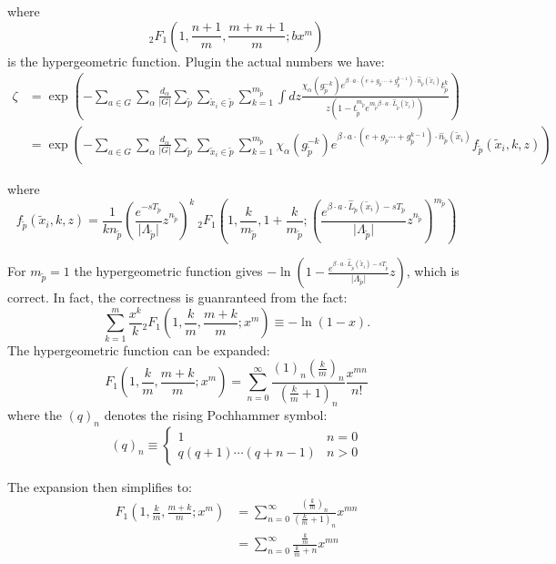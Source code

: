 \begin{description}
where 
\[
_{2}F_{1}(1,\frac{n+1}{m},\frac{m+n+1}{m};bx^{m})
\]
is the hypergeometric function. Plugin the actual numbers we have:
\begin{align*}
\zeta & =\exp\left(-\sum_{a\in G}\sum_{\alpha}\frac{d_{\alpha}}{\vert G\vert}\sum_{\tilde{p}}\sum_{\tilde{x}_{i}\in\tilde{p}}\sum_{k=1}^{m_{\tilde{p}}}\int dz\frac{\chi_{\alpha}(g_{\tilde{p}}^{-k})e^{\beta\cdot a\cdot(e+g_{\tilde{p}}\cdots+g_{\tilde{p}}^{k-1})\cdot\hat{n}_{\tilde{p}}(\tilde{x}_{i})}t_{\tilde{p}}^{k}}{z(1-t_{\tilde{p}}^{m_{\tilde{p}}}e^{m_{\tilde{p}}\beta\cdot a\cdot\hat{L}_{\tilde{p}}(\tilde{x}_{i})})}\right)\\
 & =\exp\left(-\sum_{a\in G}\sum_{\alpha}\frac{d_{\alpha}}{\vert G\vert}\sum_{\tilde{p}}\sum_{\tilde{x}_{i}\in\tilde{p}}\sum_{k=1}^{m_{\tilde{p}}}\chi_{\alpha}(g_{\tilde{p}}^{-k})e^{\beta\cdot a\cdot(e+g_{\tilde{p}}\cdots+g_{\tilde{p}}^{k-1})\cdot\hat{n}_{\tilde{p}}(\tilde{x}_{i})}f_{\tilde{p}}(\tilde{x}_{i},k,z)\right)
\end{align*}


where 
\[
f_{\tilde{p}}(\tilde{x}_{i},k,z)=\frac{1}{kn_{\tilde{p}}}\left(\frac{e^{-sT_{\tilde{p}}}}{\vert\Lambda_{\tilde{p}}\vert}z^{n_{\tilde{p}}}\right)^{k}\ _{2}F_{1}\left(1,\frac{k}{m_{\tilde{p}}},1+\frac{k}{m_{\tilde{p}}};\left(\frac{e^{\beta\cdot a\cdot\hat{L}_{\tilde{p}}(\tilde{x}_{i})-sT_{\tilde{p}}}}{\vert\Lambda_{\tilde{p}}\vert}z^{n_{\tilde{p}}}\right)^{m_{\tilde{p}}}\right)
\]


For $m_{\tilde{p}}=1$ the hypergeometric function gives $-\ln(1-\frac{e^{\beta\cdot a\cdot\hat{L}_{\tilde{p}}(\tilde{x}_{i})-sT_{\tilde{p}}}}{\vert\Lambda_{\tilde{p}}\vert}z)$,
which is correct. In fact, the correctness is guanranteed from the
fact: 
\[
\sum_{k=1}^{m}\frac{x^{k}}{k}{}_{2}F_{1}(1,\frac{k}{m},\frac{m+k}{m};x^{m})\equiv-\ln(1-x).
\]
The hypergeometric function can be expanded:
\[
F_{1}(1,\frac{k}{m},\frac{m+k}{m};x^{m})=\sum_{n=0}^{\infty}\frac{(1)_{n}(\frac{k}{m})_{n}}{(\frac{k}{m}+1)_{n}}\frac{x^{mn}}{n!}
\]
where the $(q)_{n}$ denotes the rising Pochhammer symbol:
\[
(q)_{n}\equiv\begin{cases}
1 & n=0\\
q(q+1)\cdots(q+n-1) & n>0
\end{cases}
\]


The expansion then simplifies to:
\begin{align*}
F_{1}(1,\frac{k}{m},\frac{m+k}{m};x^{m}) & =\sum_{n=0}^{\infty}\frac{(\frac{k}{m})_{n}}{(\frac{k}{m}+1)_{n}}x^{mn}\\
 & =\sum_{n=0}^{\infty}\frac{\frac{k}{m}}{\frac{k}{m}+n}x^{mn}
\end{align*}



\end{description}
